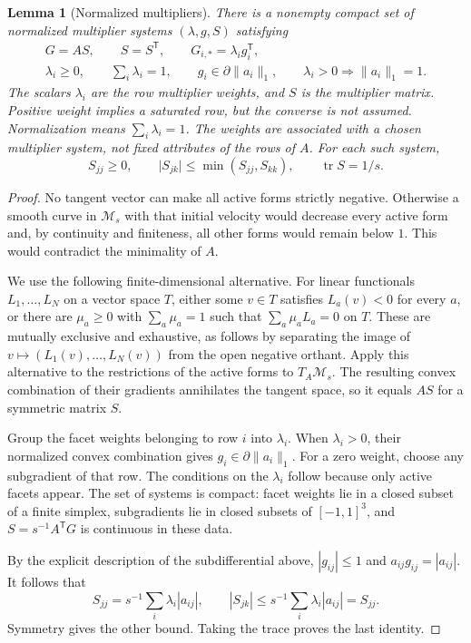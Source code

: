 \documentclass[11pt]{article}
\numberwithin{equation}{section}
\newtheorem{lemma}[lemma]{Lemma}
\theoremstyle{definition}
\theoremstyle{definition}
\newcommand{\abs}[1]{\lvert#1\rvert}
\newcommand{\norm}[1]{\lVert#1\rVert}
\DeclareMathOperator{\tr}{tr}
\begin{document}
\begin{lemma}[Normalized multipliers]\label{lem:multipliers}
There is a nonempty compact set of normalized multiplier systems
$(\lambda,g,S)$ satisfying
\begin{gather*}
 G=AS,\qquad S=S^{\mathsf T},\qquad
 G_{i,*}=\lambda_i g_i^{\mathsf T},\\
 \lambda_i\ge0,\qquad \sum_i\lambda_i=1,\qquad
 g_i\in\partial\norm{a_i}_1,
 \qquad \lambda_i>0\Longrightarrow\norm{a_i}_1=1.
\end{gather*}
The scalars $\lambda_i$ are the \emph{row multiplier weights},
and $S$ is the \emph{multiplier matrix}. Positive weight implies
a saturated row, but the converse is not assumed.
Normalization means $\sum_i\lambda_i=1$. The weights are
associated with a chosen multiplier system, not fixed attributes
of the rows of $A$. For each such system,
\begin{equation}\label{eq:multiplier-bounds}
 S_{jj}\ge0,\qquad
 \abs{S_{jk}}\le\min(S_{jj},S_{kk}),\qquad \tr S=1/s.
\end{equation}
\end{lemma}
\begin{proof}
No tangent vector can make all active forms strictly negative.
Otherwise a smooth curve in $\mathcal M_s$ with that initial velocity
would decrease every active form and, by continuity and finiteness, all
other forms would remain below $1$.  This would contradict the
minimality of $A$.

We use the following finite-dimensional alternative.  For linear
functionals $L_1,\ldots,L_N$ on a vector space $T$, either some
$v\in T$ satisfies $L_a(v)<0$ for every $a$, or there are
$\mu_a\ge0$ with $\sum_a\mu_a=1$ such that
$\sum_a\mu_aL_a=0$ on $T$.  These are mutually exclusive and
exhaustive, as follows by separating the image of
$v\mapsto(L_1(v),\ldots,L_N(v))$ from the open negative orthant.
Apply this alternative to the restrictions of the active forms to
$T_A\mathcal M_s$.  The resulting convex combination of their
gradients annihilates the tangent space, so it equals $AS$ for a
symmetric matrix $S$.

Group the facet weights belonging to row $i$ into $\lambda_i$.
When $\lambda_i>0$, their normalized convex combination gives
$g_i\in\partial\norm{a_i}_1$.  For a zero weight, choose any
subgradient of that row.  The conditions on the $\lambda_i$ follow
because only active facets appear.  The set of systems is compact:
facet weights lie in a closed subset of a finite simplex, subgradients
lie in closed subsets of $[-1,1]^3$, and
$S=s^{-1}A^{\mathsf T}G$ is continuous in these data.

By the explicit description of the subdifferential above,
$|g_{ij}|\le1$ and $a_{ij}g_{ij}=|a_{ij}|$. It follows that
\[
 S_{jj}=s^{-1}\sum_i\lambda_i|a_{ij}|,\qquad
 |S_{jk}|\le s^{-1}\sum_i\lambda_i|a_{ij}|=S_{jj}.
\]
Symmetry gives the other bound. Taking the trace proves the last identity.
\end{proof}
\end{document}
